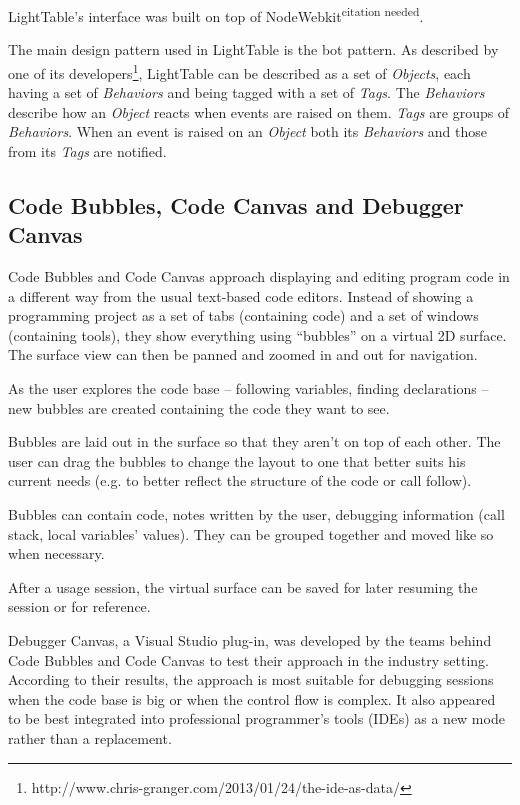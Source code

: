 \documentclass{./llncs2e/llncs}
\begin{document}
	LightTable's interface was built on top of NodeWebkit\textsuperscript{citation needed}.

	The main design pattern used in LightTable is the \ac{bot} pattern. As described by one of its developers\footnote{http://www.chris-granger.com/2013/01/24/the-ide-as-data/}, LightTable can be described as a set of \emph{Objects}, each having a set of \emph{Behaviors} and being tagged with a set of \emph{Tags}. The \emph{Behaviors} describe how an \emph{Object} reacts when events are raised on them. \emph{Tags} are groups of \emph{Behaviors}. When an event is raised on an \emph{Object} both its \emph{Behaviors} and those from its \emph{Tags} are notified.


\subsection{Code Bubbles, Code Canvas and Debugger Canvas}
	Code Bubbles and Code Canvas approach displaying and editing program code in a different way from the usual text-based code editors. Instead of showing a programming project as a set of tabs (containing code) and a set of windows (containing tools), they show everything using ``bubbles'' on a virtual 2D surface. The surface view can then be panned and zoomed in and out for navigation.

	As the user explores the code base -- following variables, finding declarations -- new bubbles are created containing the code they want to see.

	Bubbles are laid out in the surface so that they aren't on top of each other. The user can drag the bubbles to change the layout to one that better suits his current needs (e.g. to better reflect the structure of the code or call follow).

	Bubbles can contain code, notes written by the user, debugging information (call stack, local variables' values). They can be grouped together and moved like so when necessary.

	After a usage session, the virtual surface can be saved for later resuming the session or for reference.

	Debugger Canvas, a Visual Studio plug-in, was developed by the teams behind Code Bubbles and Code Canvas to test their approach in the industry setting. According to their results, the approach is most suitable for debugging sessions when the code base is big or when the control flow is complex. It also appeared to be best integrated into professional programmer's tools (IDEs) as a new mode rather than a replacement.
\end{document}

